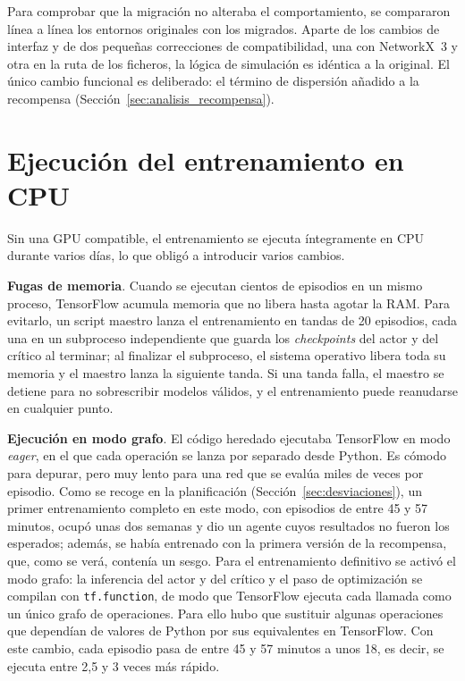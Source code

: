 Para comprobar que la migración no alteraba el comportamiento, se compararon línea a línea los entornos originales con los migrados. Aparte de los cambios de interfaz y de dos pequeñas correcciones de compatibilidad, una con NetworkX~3 y otra en la ruta de los ficheros, la lógica de simulación es idéntica a la original. El único cambio funcional es deliberado: el término de dispersión añadido a la recompensa (Sección~\ref{sec:analisis_recompensa}).

\section{Ejecución del entrenamiento en CPU}\label{sec:ejecucion}

Sin una GPU compatible, el entrenamiento se ejecuta íntegramente en CPU durante varios días, lo que obligó a introducir varios cambios.

\textbf{Fugas de memoria}. Cuando se ejecutan cientos de episodios en un mismo proceso, TensorFlow acumula memoria que no libera hasta agotar la RAM. Para evitarlo, un script maestro lanza el entrenamiento en tandas de 20 episodios, cada una en un subproceso independiente que guarda los \textit{checkpoints} del actor y del crítico al terminar; al finalizar el subproceso, el sistema operativo libera toda su memoria y el maestro lanza la siguiente tanda. Si una tanda falla, el maestro se detiene para no sobrescribir modelos válidos, y el entrenamiento puede reanudarse en cualquier punto.

\textbf{Ejecución en modo grafo}. El código heredado ejecutaba TensorFlow en modo \textit{eager}, en el que cada operación se lanza por separado desde Python. Es cómodo para depurar, pero muy lento para una red que se evalúa miles de veces por episodio. Como se recoge en la planificación (Sección~\ref{sec:desviaciones}), un primer entrenamiento completo en este modo, con episodios de entre 45 y 57 minutos, ocupó unas dos semanas y dio un agente cuyos resultados no fueron los esperados; además, se había entrenado con la primera versión de la recompensa, que, como se verá, contenía un sesgo. Para el entrenamiento definitivo se activó el modo grafo: la inferencia del actor y del crítico y el paso de optimización se compilan con \texttt{tf.function}, de modo que TensorFlow ejecuta cada llamada como un único grafo de operaciones. Para ello hubo que sustituir algunas operaciones que dependían de valores de Python por sus equivalentes en TensorFlow. Con este cambio, cada episodio pasa de entre 45 y 57 minutos a unos 18, es decir, se ejecuta entre 2,5 y 3 veces más rápido.

